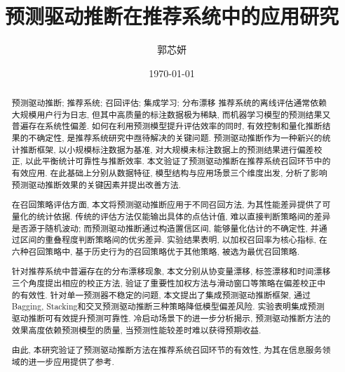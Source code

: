 \documentclass[a4paper, AutoFakeBold, UTF8]{ctexrep}
\title{预测驱动推断在推荐系统中的应用研究}
\author{郭芯妍}
\date{\today}
\theoremstyle{plain}
\numberwithin{equation}{chapter}
\begin{document}

\makecover

\begin{abstract}{预测驱动推断; 推荐系统; 召回评估; 集成学习; 分布漂移}
推荐系统的离线评估通常依赖大规模用户行为日志, 但其中高质量的标注数据极为稀缺, 而机器学习模型的预测结果又普遍存在系统性偏差. 如何在利用预测模型提升评估效率的同时, 有效控制和量化推断结果的不确定性, 是推荐系统研究中亟待解决的关键问题. 预测驱动推断作为一种新兴的统计推断框架, 以小规模标注数据为基准, 对大规模未标注数据上的预测结果进行偏差校正, 以此平衡统计可靠性与推断效率. 本文验证了预测驱动推断在推荐系统召回环节中的有效应用. 在此基础上分别从数据特征, 模型结构与应用场景三个维度出发, 分析了影响预测驱动推断效果的关键因素并提出改善方法. 

在召回策略评估方面, 本文将预测驱动推断应用于不同召回方法, 为其性能差异提供了可量化的统计依据. 传统的评估方法仅能输出具体的点估计值, 难以直接判断策略间的差异是否源于随机波动; 而预测驱动推断通过构造置信区间, 能够量化估计的不确定性, 并通过区间的重叠程度判断策略间的优劣差异. 实验结果表明, 以加权召回率为核心指标, 在六种召回策略中, 基于历史行为的召回策略优于其他策略, 被选为最优召回策略. 

针对推荐系统中普遍存在的分布漂移现象, 本文分别从协变量漂移, 标签漂移和时间漂移三个角度提出相应的校正方法, 验证了重要性加权方法与滑动窗口等策略在偏差校正中的有效性. 针对单一预测器不稳定的问题, 本文提出了集成预测驱动推断框架, 通过Bagging, Stacking和交叉预测驱动推断三种策略降低模型偏差风险. 实验表明集成预测驱动推断可有效提升预测可靠性. 冷启动场景下的进一步分析揭示, 预测驱动推断方法的效果高度依赖预测模型的质量, 当预测性能较差时难以获得预期收益. 

由此, 本研究验证了预测驱动推断方法在推荐系统召回环节的有效性, 为其在信息服务领域的进一步应用提供了参考. 


\end{abstract}
\end{document}
